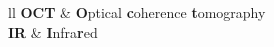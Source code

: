 \documentclass[
12pt, %
nolistspacing, %
liststotoc, %
headsepline, %
consistentlayout, %
]{MastersDoctoralThesis} %
\begin{document}


\begin{acknowledgements}
\vspace{15pt}
\singlespacing
\lipsum[1-3]
\end{acknowledgements}


\tableofcontents %

\listoffigures %



\begin{abbreviations}{ll} %
\textbf{OCT} & \textbf{O}ptical \textbf{c}oherence \textbf{t}omography\\
\textbf{IR} & \textbf{I}nfra\textbf{r}ed\\
\end{abbreviations}





\end{document}
